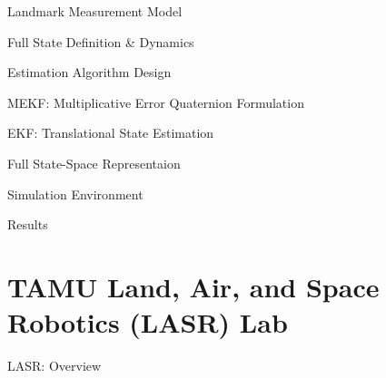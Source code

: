 \documentclass[10pt]{beamer}
\begin{document}
\begin{frame}{Landmark Measurement Model}
\end{frame}

\begin{frame}{Full State Definition \& Dynamics}
\end{frame}

\begin{frame}{Estimation Algorithm Design}
\end{frame}


\begin{frame}{MEKF: Multiplicative Error Quaternion Formulation}
\end{frame}

\begin{frame}{EKF: Translational State Estimation}
\end{frame}

\begin{frame}{Full State-Space Representaion}
\end{frame}


\begin{frame}{Simulation Environment}
\end{frame}

\begin{frame}{Results}
\end{frame}



\section{TAMU Land, Air, and Space Robotics (LASR) Lab}
\begin{frame}{LASR: Overview}
\end{frame}
\end{document}
